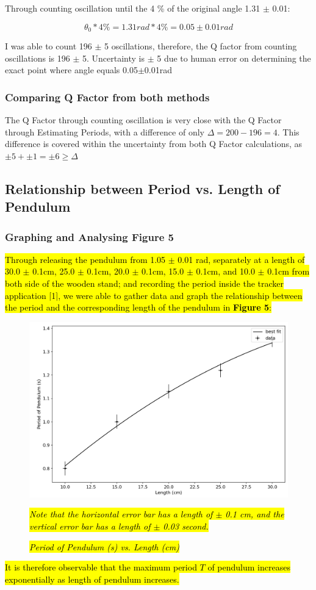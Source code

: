 \documentclass{article}
\begin{document}
Through counting oscillation until the 4 \% of the original angle 1.31 $\pm$ 0.01:

\[ \theta_0 * 4 \% = 1.31 rad * 4 \% = 0.05 \pm 0.01 rad \]

\noindent I was able to count 196 $\pm$ 5 oscillations, therefore, the Q factor from counting oscillations is 196 $\pm$ 5. Uncertainty is $\pm$ 5 due to human error on determining the exact point where angle equals 0.05$\pm$0.01rad

\subsubsection{Comparing Q Factor from both methods}

The Q Factor through counting oscillation is very close with the Q Factor through Estimating Periods, with a difference of only $\Delta = 200-196=4$. This difference is covered within the uncertainty from both Q Factor calculations, as $\pm 5 + \pm 1 = \pm 6 \geqslant \Delta $


\subsection{Relationship between Period vs. Length of Pendulum}
\subsubsection{Graphing and Analysing Figure 5}
\hl{ Through releasing the pendulum from 1.05 $\pm$ 0.01 rad, separately at a length of  30.0 $\pm$ 0.1cm,  25.0 $\pm$ 0.1cm, 20.0 $\pm$ 0.1cm, 15.0 $\pm$ 0.1cm, and 10.0 $\pm$ 0.1cm  from both side of the wooden stand; and recording the period inside the tracker application [1], we were able to gather data and graph the relationship between the period and the corresponding length of the pendulum in \textbf{Figure 5}: }

\begin{figure}[!htp]
	\includegraphics[scale = 0.3]{Pendulum_Length_Image.png}
	\caption{\textit{\hl{Period of Pendulum (s) vs. Length (cm)}}}
	\center \textit{\hl{Note that the horizontal error bar has a length of $\pm$ 0.1 cm, and the vertical error bar has a length of $\pm$ 0.03 second. }}
	\label{length}
\end{figure}
\hl{It is therefore observable that the maximum period $T$ of pendulum increases exponentially as length of pendulum increases.}
\end{document}
